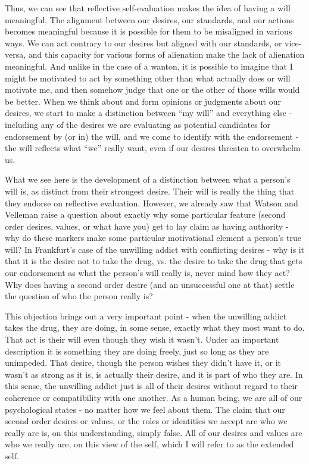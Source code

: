 \documentclass[phd,12pt,oneside,paper=letterpaper]{ubcthesis}
\begin{document}
Thus, we can see that reflective self-evaluation makes the idea of having a will meaningful. The alignment between our desires, our standards, and our actions becomes meaningful because it is possible for them to be misaligned in various ways. We can act contrary to our desires but aligned with our standards, or vice-versa, and this capacity for various forms of alienation make the lack of alienation meaningful. And unlike in the case of a wanton, it is possible to imagine that I might be motivated to act by something other than what actually does or will motivate me, and then somehow judge that one or the other of those wills would be better. When we think about and form opinions or judgments about our desires, we start to make a distinction between ``my will'' and everything else - including any of the desires we are evaluating as potential candidates for endorsement by (or in) the will, and we come to identify with the endorsement - the will reflects what ``we'' really want, even if our desires threaten to overwhelm us.

What we see here is the development of a distinction between what a person's will is, as distinct from their strongest desire. Their will is really the thing that they endorse on reflective evaluation. However, we already saw that Watson and Velleman raise a question about exactly why some particular feature (second order desires, values, or what have you) get to lay claim as having authority - why do these markers make some particular motivational element a person's true will? In Frankfurt's case of the unwilling addict with conflicting desires - why is it that it is the desire not to take the drug, vs. the desire to take the drug that gets our endorsement as what the person's will really is, never mind how they act? Why does having a second order desire (and an unsuccessful one at that) settle the question of who the person really is? 

This objection brings out a very important point - when the unwilling addict takes the drug, they are doing, in some sense, exactly what they most want to do. That act is their will even though they wish it wasn't. Under an important description it is something they are doing freely, just so long as they are unimpeded. That desire, though the person wishes they didn't have it, or it wasn't as strong as it is, is actually their desire, and it is part of who they are. In this sense, the unwilling addict just is all of their desires without regard to their coherence or compatibility with one another. As a human being, we are all of our psychological states - no matter how we feel about them. The claim that our second order desires or values, or the roles or identities we accept are who we really are is, on this understanding, simply false. All of our desires and values are who we really are, on this view of the self, which I will refer to as the extended self.
\end{document}
